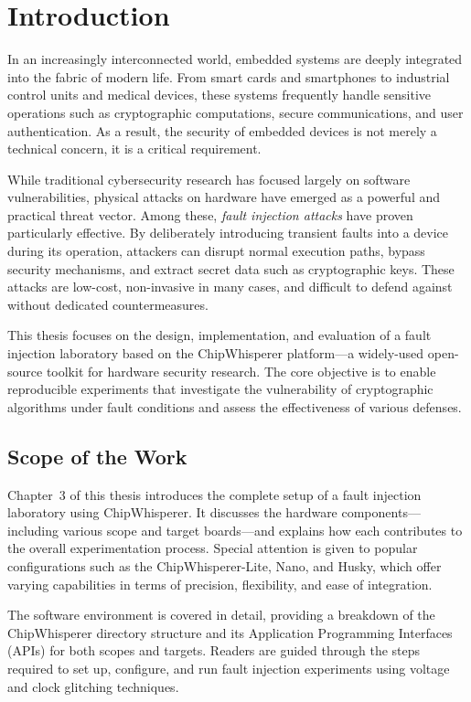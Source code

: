 \chapter{Introduction}


In an increasingly interconnected world, embedded systems are deeply integrated into the fabric of modern life. From smart cards and smartphones to industrial control units and medical devices, these systems frequently handle sensitive operations such as cryptographic computations, secure communications, and user authentication. As a result, the security of embedded devices is not merely a technical concern, it is a critical requirement.

While traditional cybersecurity research has focused largely on software vulnerabilities, physical attacks on hardware have emerged as a powerful and practical threat vector. Among these, \textit{fault injection attacks} have proven particularly effective. By deliberately introducing transient faults into a device during its operation, attackers can disrupt normal execution paths, bypass security mechanisms, and extract secret data such as cryptographic keys. These attacks are low-cost, non-invasive in many cases, and difficult to defend against without dedicated countermeasures.

This thesis focuses on the design, implementation, and evaluation of a fault injection laboratory based on the ChipWhisperer platform—a widely-used open-source toolkit for hardware security research. The core objective is to enable reproducible experiments that investigate the vulnerability of cryptographic algorithms under fault conditions and assess the effectiveness of various defenses.

\section*{Scope of the Work}

Chapter~3 of this thesis introduces the complete setup of a fault injection laboratory using ChipWhisperer. It discusses the hardware components—including various scope and target boards—and explains how each contributes to the overall experimentation process. Special attention is given to popular configurations such as the ChipWhisperer-Lite, Nano, and Husky, which offer varying capabilities in terms of precision, flexibility, and ease of integration.

The software environment is covered in detail, providing a breakdown of the ChipWhisperer directory structure and its Application Programming Interfaces (APIs) for both scopes and targets. Readers are guided through the steps required to set up, configure, and run fault injection experiments using voltage and clock glitching techniques.

